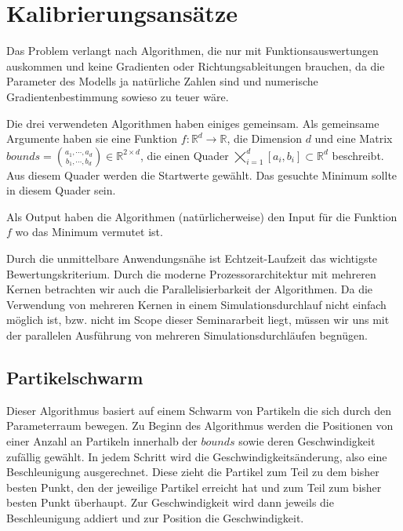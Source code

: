 \documentclass[a4paper,12pt]{article}
\begin{document}
\newpage

\section{Kalibrierungsansätze}

Das Problem verlangt nach Algorithmen, die nur mit Funktionsauswertungen auskommen und keine Gradienten oder Richtungsableitungen brauchen, da die Parameter des Modells ja natürliche Zahlen sind und numerische Gradientenbestimmung sowieso zu teuer wäre.

Die drei verwendeten Algorithmen haben einiges gemeinsam. Als gemeinsame Argumente haben sie eine Funktion $f: \mathbb{R}^d \rightarrow \mathbb{R}$, die Dimension $d$ und eine Matrix $bounds = \binom{a_1, \cdots, a_d}{b_1, \cdots, b_d} \in \mathbb{R}^{2\times d}$, die einen Quader $\bigtimes\nolimits_{i=1}^d [a_i, b_i] \subset \mathbb{R}^d$ beschreibt. Aus diesem Quader werden die Startwerte gewählt. Das gesuchte Minimum sollte in diesem Quader sein. 

Als Output haben die Algorithmen (natürlicherweise) den Input für die Funktion $f$ wo das Minimum vermutet ist. 

Durch die unmittelbare Anwendungsnähe ist Echtzeit-Laufzeit das wichtigste Bewertungskriterium. Durch die moderne Prozessorarchitektur mit mehreren Kernen betrachten wir auch die Parallelisierbarkeit der Algorithmen. Da die Verwendung von mehreren Kernen in einem Simulationsdurchlauf nicht einfach möglich ist, bzw. nicht im Scope dieser Seminararbeit liegt, müssen wir uns mit der parallelen Ausführung von mehreren Simulationsdurchläufen begnügen.

\subsection{Partikelschwarm}

Dieser Algorithmus basiert auf einem Schwarm von Partikeln die sich durch den Parameterraum bewegen. Zu Beginn des Algorithmus werden die Positionen von einer Anzahl an Partikeln innerhalb der $bounds$ sowie deren Geschwindigkeit zufällig gewählt. In jedem Schritt wird die Geschwindigkeitsänderung, also eine Beschleunigung ausgerechnet. Diese zieht die Partikel zum Teil zu dem bisher besten Punkt, den der jeweilige Partikel erreicht hat und zum Teil zum bisher besten Punkt überhaupt. Zur Geschwindigkeit wird dann jeweils die Beschleunigung addiert und zur Position die Geschwindigkeit. 
\end{document}
